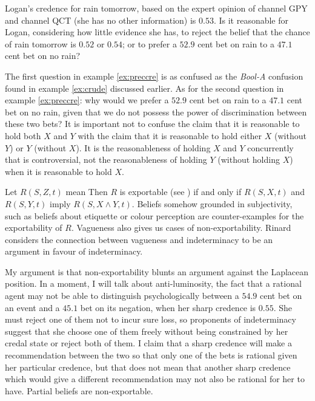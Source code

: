 \documentclass[11pt]{article}
\newcommand{\anderson}[0]{\textit{Bool-A}}
\begin{document}
\begin{quotex}
  \label{ex:preccre} Logan's credence for
  rain tomorrow, based on the expert opinion of channel GPY and
  channel QCT (she has no other information) is $0.53$. Is it
  reasonable for Logan, considering how little evidence she has, to
  reject the belief that the chance of rain tomorrow is $0.52$ or
  $0.54$; or to prefer a $52.9$ cent bet on rain to a $47.1$ cent bet
  on no rain?
\end{quotex}

The first question in example \ref{ex:preccre} is as confused as the
{\anderson} confusion found in example \ref{ex:crude} discussed
earlier. As for the second question in example \ref{ex:preccre}: why
would we prefer a $52.9$ cent bet on rain to a $47.1$ cent bet on no
rain, given that we do not possess the power of discrimination between
these two bets? It is important not to confuse the claim that it is
reasonable to hold both $X$ and $Y$ with the claim that it is
reasonable to hold either $X$ (without $Y$) or $Y$ (without $X$). It
is the reasonableness of holding $X$ and $Y$ concurrently that is
controversial, not the reasonableness of holding $Y$ (without holding
$X$) when it is reasonable to hold $X$.

Let $R(S,Z,t)$ mean  Then $R$ is exportable (see ) if
and only if $R(S,X,t)$ and $R(S,Y,t)$ imply $R(S,X\wedge{}Y,t)$.
Beliefs somehow grounded in subjectivity, such as beliefs about
etiquette or colour perception are counter-examples for the
exportability of $R$. Vagueness also gives us cases of
non-exportability. Rinard considers the connection between vagueness
and indeterminacy to be an argument in favour of indeterminacy.

My argument is that non-exportability blunts an argument against the
Laplacean position. In a moment, I will talk about anti-luminosity,
the fact that a rational agent may not be able to distinguish
psychologically between a $54.9$ cent bet on an event and a $45.1$ bet
on its negation, when her sharp credence is $0.55$. She must reject
one of them not to incur sure loss, so proponents of indeterminacy
suggest that she choose one of them freely without being constrained
by her credal state or reject both of them. I claim that a sharp
credence will make a recommendation between the two so that only one
of the bets is rational given her particular credence, but that does
not mean that another sharp credence which would give a different
recommendation may not also be rational for her to have. Partial
beliefs are non-exportable.
\end{document}
